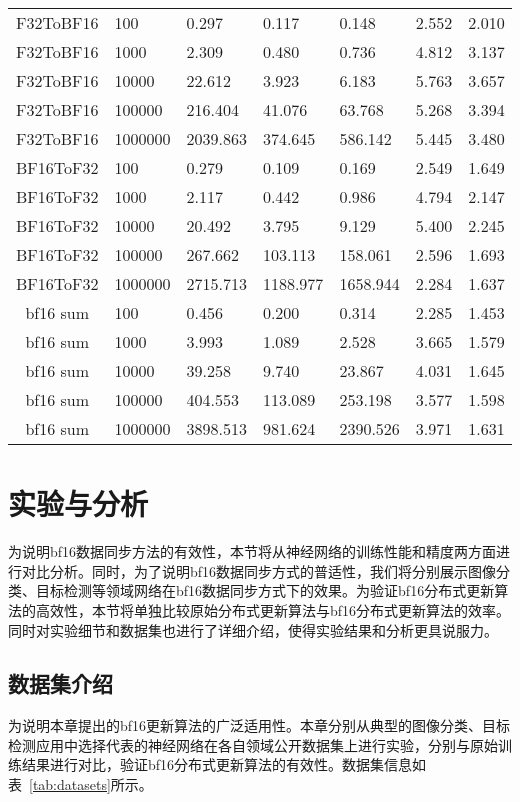 \begin{longtable}[c]{c*{6}{l}}
\endfoot%
\endlastfoot%
F32ToBF16 &	100 & 0.297 & 0.117 & 0.148 & 2.552 & 2.010  \\
F32ToBF16 &	1000 & 2.309 & 0.480 & 0.736 & 4.812 & 3.137  \\
F32ToBF16 &	10000 & 22.612 & 3.923 & 6.183 & 5.763 & 3.657  \\
F32ToBF16 &	100000 & 216.404 & 41.076 & 63.768 & 5.268 & 3.394 \\
F32ToBF16 &	1000000 & 2039.863 & 374.645 & 586.142 & 5.445 & 3.480 \\
BF16ToF32 &	100 & 0.279 & 0.109 & 0.169 & 2.549 & 1.649 \\
BF16ToF32 &	1000 & 2.117 & 0.442 & 0.986 & 4.794 & 2.147 \\
BF16ToF32 &	10000 & 20.492 & 3.795 & 9.129 & 5.400 & 2.245 \\
BF16ToF32 &	100000 & 267.662 & 103.113 & 158.061 & 2.596 & 1.693 \\
BF16ToF32 &	1000000 & 2715.713 & 1188.977 & 1658.944 & 2.284 & 1.637 \\
bf16 sum &	100 & 0.456 & 0.200 & 0.314 & 2.285 & 1.453 \\
bf16 sum &	1000 & 3.993 & 1.089 & 2.528 & 3.665 & 1.579 \\
bf16 sum &	10000 & 39.258 & 9.740 & 23.867 & 4.031 & 1.645 \\
bf16 sum &	100000 & 404.553 & 113.089 & 253.198 & 3.577 & 1.598 \\
bf16 sum &	1000000 & 3898.513 & 981.624 & 2390.526 & 3.971 & 1.631 \\
\bottomrule[1.5pt]
\end{longtable}

\section{实验与分析}
为说明bf16数据同步方法的有效性，本节将从神经网络的训练性能和精度两方面进行对比分析。同时，为了说明bf16数据同步方式的普适性，我们将分别展示图像分类、目标检测等领域网络在bf16数据同步方式下的效果。为验证bf16分布式更新算法的高效性，本节将单独比较原始分布式更新算法与bf16分布式更新算法的效率。同时对实验细节和数据集也进行了详细介绍，使得实验结果和分析更具说服力。

\subsection{数据集介绍}
为说明本章提出的bf16更新算法的广泛适用性。本章分别从典型的图像分类、目标检测应用中选择代表的神经网络在各自领域公开数据集上进行实验，分别与原始训练结果进行对比，验证bf16分布式更新算法的有效性。数据集信息如表~\ref{tab:datasets}所示。

